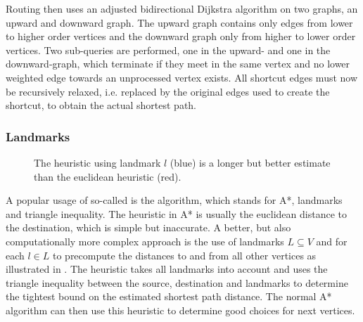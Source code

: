 			Routing then uses an adjusted bidirectional Dijkstra algorithm\cite[29-30]{geisberger-contraction-hierarchies} on two graphs, an upward and downward graph.
			The upward graph contains only edges from lower to higher order vertices and the downward graph only from higher to lower order vertices.
			Two sub-queries are performed, one in the upward- and one in the downward-graph, which terminate if they meet in the same vertex and no lower weighted edge towards an unprocessed vertex exists.
			All shortcut edges must now be recursively relaxed, i.e. replaced by the original edges used to create the shortcut, to obtain the actual shortest path.
		
		\subsubsection{Landmarks}
		\label{subsubsec:landmarks}
			
			\begin{figure}
				\vspace{-3\baselineskip}
				\begin{figcenter}
				\end{figcenter}
				\caption[Illustration of landmark heuristic.]{The heuristic using landmark $l$ (blue) is a longer but better estimate than the euclidean heuristic (red).}
				\label{fig:landmarks}
			\end{figure}
			
			A popular usage of so-called  is the  algorithm, which stands for A*, landmarks and triangle inequality\cite{goldberg-landmarks}.
			The heuristic in A* is usually the euclidean distance to the destination, which is simple but inaccurate.
			A better, but also computationally more complex approach is the use of landmarks $L \subseteq V$ and for each $l \in L$ to precompute the distances to and from all other vertices as illustrated in .
			The heuristic takes all landmarks into account and uses the triangle inequality between the source, destination and landmarks to determine the tightest bound on the estimated shortest path distance.
			The normal A* algorithm can then use this heuristic to determine good choices for next vertices.
		
